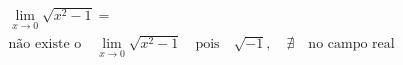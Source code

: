 \begin{ex}
\begin{align}
&\lim_{x\rightarrow 0} \sqrt{x^2-1}=\nonumber\\
&\text{não existe o}\quad\lim_{x\rightarrow 0} \sqrt{x^2-1}\quad\text{pois}\quad\sqrt{-1},\quad\nexists\quad\text{no campo real}\nonumber
\end{align}
\end{ex}
